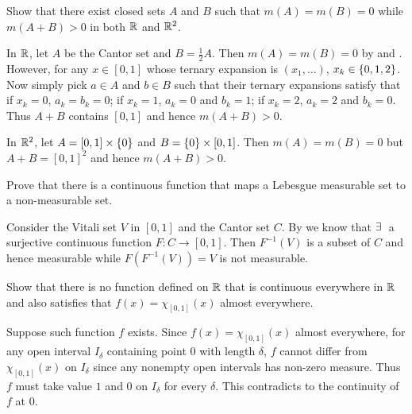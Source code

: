 \begin{exercise}
    Show that there exist closed sets $A$ and $B$ such that 
    $m(A)=m(B)=0$ while $m(A+B)>0$ in both $\mathbb{R}$ and $\mathbb{R}^2$.
\end{exercise}
\begin{pf}
    In $\mathbb{R}$, let $A$ be the Cantor set and $B=\frac{1}{2}A$. 
    Then $m(A)=m(B)=0$ by  and . 
    However, for any $x\in [0,1]$ whose ternary expansion is 
    $(x_1,\ldots)$, $x_k\in\left\{ {0,1,2} \right\}$. Now simply pick 
    $a\in A$ and $b\in B$ such that their ternary expansions 
    satisfy that if $x_k=0$, $a_k=b_k=0$; if $x_k=1$, $a_k=0$ 
    and $b_k=1$; if $x_k=2$, $a_k=2$ and $b_k=0$. Thus 
    $A+B$ contains $[0,1]$ and hence $m(A+B)>0$. 

    In $\mathbb{R}^2$, let $A=[0,1]\times\left\{ {0} \right\}$ and $B=
    \left\{ {0} \right\}\times[0,1]$. Then $m(A)=m(B)=0$ but $A+B=[0,1]^2$ 
    and hence $m(A+B)>0$.
\end{pf}

\begin{exercise}
    Prove that there is a continuous function that maps a 
    Lebesgue measurable set to a non-measurable set. 
\end{exercise}
\begin{pf}
    Consider the Vitali set $V$ in $[0,1]$ and the Cantor set 
    $C$. By  we know that $\exists\:$ a surjective 
    continuous function $F:C\to [0,1]$. Then $F^{-1}(V)$ is 
    a subset of $C$ and hence measurable while $F(F^{-1}(V)) 
    = V$ is not measurable. 
\end{pf}

\begin{exercise}
    Show that there is no function defined on $\mathbb{R}$ that is 
    continuous everywhere in $\mathbb{R}$ and also satisfies that 
    $f(x) = \chi_{[0,1]}(x)$ almost everywhere.
\end{exercise}
\begin{pf}
    Suppose such function $f$ exists. Since $f(x) = 
    \chi_{[0,1]}(x)$ almost everywhere, for any open 
    interval $I_\delta$ containing point $0$ with length 
    $\delta$, $f$ cannot differ from $\chi_{[0,1]}(x)$ on 
    $I_\delta$ since any nonempty open intervals has non-zero
    measure. Thus $f$ must take value $1$ and $0$ on 
    $I_\delta$ for every $\delta$. This contradicts to 
    the continuity of $f$ at $0$.
\end{pf}

